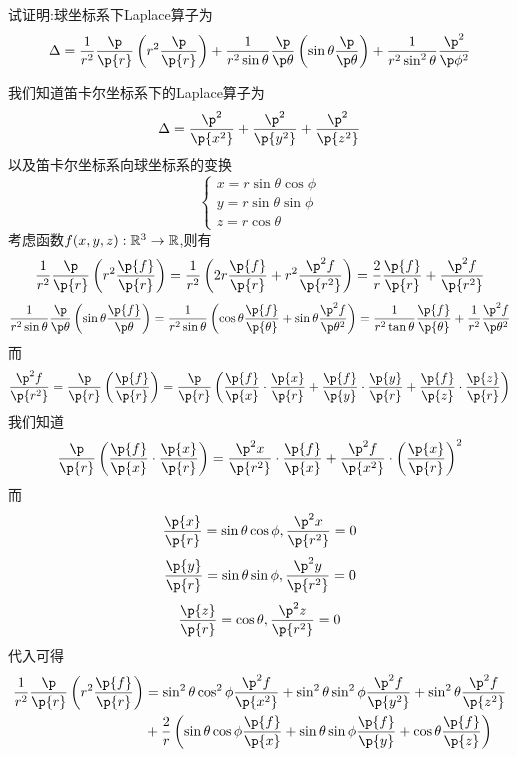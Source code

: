 \documentclass{ctexart}
\begin{document}
\pagestyle{empty}
\begin{problem}[古早计算大赛题目]
    试证明:球坐标系下Laplace算子为
    $$\Delta=\dfrac{1}{r^2}\dfrac{\p}{\p{r}}\left(r^2\dfrac{\p}{\p{r}}\right)+\dfrac{1}{r^2\sin\theta}\dfrac{\p}{\p\theta}\left(\sin\theta\dfrac{\p}{\p\theta}\right)+\dfrac{1}{r^2\sin^2\theta}\dfrac{\p^2}{\p\phi^2}$$
\end{problem}
\begin{solution}[Proof.]
    我们知道笛卡尔坐标系下的Laplace算子为
    $$\Delta=\dfrac{\p^2}{\p{x^2}}+\dfrac{\p^2}{\p{y^2}}+\dfrac{\p^2}{\p{z^2}}$$
    以及笛卡尔坐标系向球坐标系的变换
    $$\left\{\begin{array}{l}
    x=r\sin\theta\cos\phi\\
    y=r\sin\theta\sin\phi\\
    z=r\cos\theta
    \end{array}\right.$$
    考虑函数$f(x,y,z):\R^3\to\R$,则有
    $$\dfrac{1}{r^2}\dfrac{\p}{\p{r}}\left(r^2\dfrac{\p{f}}{\p{r}}\right)
    =\dfrac{1}{r^2}\left(2r\dfrac{\p{f}}{\p{r}}+r^2\dfrac{\p^2 f}{\p{r^2}}\right)
    =\dfrac{2}{r}\dfrac{\p{f}}{\p{r}}+\dfrac{\p^2f}{\p{r^2}}
    $$
    $$\dfrac{1}{r^2\sin\theta}\dfrac{\p}{\p\theta}\left(\sin\theta\dfrac{\p{f}}{\p\theta}\right)
    =\dfrac{1}{r^2\sin\theta}\left(\cos\theta\dfrac{\p{f}}{\p{\theta}}+\sin\theta\dfrac{\p^2f}{\p\theta^2}\right)
    =\dfrac{1}{r^2\tan\theta}\dfrac{\p{f}}{\p{\theta}}+\dfrac{1}{r^2}\dfrac{\p^2f}{\p\theta^2}$$
    而
    $$\dfrac{\p^2{f}}{\p{r^2}}=\dfrac{\p}{\p{r}}\left(\dfrac{\p{f}}{\p{r}}\right)=\dfrac{\p}{\p{r}}\left(\dfrac{\p{f}}{\p{x}}\cdot\dfrac{\p{x}}{\p{r}}+\dfrac{\p{f}}{\p{y}}\cdot\dfrac{\p{y}}{\p{r}}+\dfrac{\p{f}}{\p{z}}\cdot\dfrac{\p{z}}{\p{r}}\right)$$
    我们知道$$\dfrac{\p}{\p{r}}\left(\dfrac{\p{f}}{\p{x}}\cdot\dfrac{\p{x}}{\p{r}}\right)=\dfrac{\p^2x}{\p{r^2}}\cdot\dfrac{\p{f}}{\p{x}}+\dfrac{\p^2f}{\p{x^2}}\cdot\left(\dfrac{\p{x}}{\p{r}}\right)^2$$
    而
    $$\dfrac{\p{x}}{\p{r}}=\sin\theta\cos\phi,\dfrac{\p^2x}{\p{r^2}}=0$$
    $$\dfrac{\p{y}}{\p{r}}=\sin\theta\sin\phi,\dfrac{\p^2y}{\p{r^2}}=0$$
    $$\dfrac{\p{z}}{\p{r}}=\cos\theta,\dfrac{\p^2z}{\p{r^2}}=0$$
    代入可得
    $$\begin{aligned}
        \dfrac{1}{r^2}\dfrac{\p}{\p{r}}\left(r^2\dfrac{\p{f}}{\p{r}}\right)
        &= \sin^2\theta\cos^2\phi\dfrac{\p^2f}{\p{x^2}}+\sin^2\theta\sin^2\phi\dfrac{\p^2f}{\p{y^2}}+\sin^2\theta\dfrac{\p^2f}{\p{z^2}}\\
        &+ \dfrac{2}{r}\left(\sin\theta\cos\phi\dfrac{\p{f}}{\p{x}}+\sin\theta\sin\phi\dfrac{\p{f}}{\p{y}}+\cos\theta\dfrac{\p{f}}{\p{z}}\right)

\end{aligned}$$
\end{solution}
\end{document}
